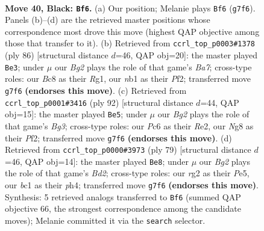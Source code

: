 \documentclass[11pt]{article}
\begin{document}
\clearpage

\begin{figure}[p]\centering
\begin{subfigure}{0.46\textwidth}\centering
\resizebox{\linewidth}{!}{%
\newchessgame
\chessboard[
  setfen={r1b2kn1/2p3bR/p1p5/8/8/8/6R1/1NB1K3 b - - 6 40},
  showmover=false,
  pgfstyle=straightmove, color=movearrow, markmove={g7-f6}
]}
\caption{}
\end{subfigure}\hfill
\begin{subfigure}{0.46\textwidth}\centering
\resizebox{\linewidth}{!}{%
\newchessgame
\chessboard[
  setfen={8/Br6/4k1p1/7p/2K5/2b4P/5PP1/6R1 w - - 5 44},
  showmover=false,
  pgfstyle=straightmove, color=movearrow, markmove={a7-e3}
]}
\caption{}
\end{subfigure}
\\[4pt]
\begin{subfigure}{0.46\textwidth}\centering
\resizebox{\linewidth}{!}{%
\newchessgame
\chessboard[
  setfen={8/5bpk/2B5/7n/1r6/6BP/4RP1K/8 w - - 0 47},
  showmover=false,
  pgfstyle=straightmove, color=movearrow, markmove={g3-e5}
]}
\caption{}
\end{subfigure}\hfill
\begin{subfigure}{0.46\textwidth}\centering
\resizebox{\linewidth}{!}{%
\newchessgame
\chessboard[
  setfen={8/3b2R1/4kn2/1p2p3/7P/P7/5P2/2K5 b - - 5 40},
  showmover=false,
  pgfstyle=straightmove, color=movearrow, markmove={d7-e8}
]}
\caption{}
\end{subfigure}
\caption{\textbf{Move 40, Black: \texttt{Bf6}.} (a) Our position; Melanie plays \texttt{Bf6} (\texttt{g7f6}). Panels (b)--(d) are the retrieved master positions whose correspondence most drove this move (highest QAP objective among those that transfer to it). (b) Retrieved from \texttt{ccrl\_top\_p0003\#1378} (ply 86) [structural distance $d$=46, QAP obj=20]: the master played \texttt{Be3}; under $\mu$ our \emph{Bg2} plays the role of that game's \emph{Ba7}; cross-type roles: our \emph{B}c8 as their \emph{R}g1, our \emph{n}b1 as their \emph{P}f2; transferred move \texttt{g7f6} \textbf{(endorses this move)}. (c) Retrieved from \texttt{ccrl\_top\_p0001\#3416} (ply 92) [structural distance $d$=44, QAP obj=15]: the master played \texttt{Be5}; under $\mu$ our \emph{Bg2} plays the role of that game's \emph{Bg3}; cross-type roles: our \emph{P}c6 as their \emph{R}e2, our \emph{N}g8 as their \emph{P}f2; transferred move \texttt{g7f6} \textbf{(endorses this move)}. (d) Retrieved from \texttt{ccrl\_top\_p0000\#3973} (ply 79) [structural distance $d$=46, QAP obj=14]: the master played \texttt{Be8}; under $\mu$ our \emph{Bg2} plays the role of that game's \emph{Bd2}; cross-type roles: our \emph{r}g2 as their \emph{P}e5, our \emph{b}c1 as their \emph{p}h4; transferred move \texttt{g7f6} \textbf{(endorses this move)}. Synthesis: 5 retrieved analogs transferred to \texttt{Bf6} (summed QAP objective 66, the strongest correspondence among the candidate moves); Melanie committed it via the \texttt{search} selector.}
\label{fig:thought-m79}
\end{figure}
\end{document}
